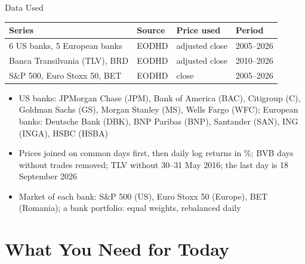 \begin{frame}{Data Used}
\itemsize{\footnotesize}
\begin{center}
\footnotesize
\begin{tabular}{llll}
\toprule
\textbf{Series} & \textbf{Source} & \textbf{Price used} & \textbf{Period} \\
\midrule
6 US banks, 5 European banks & EODHD & adjusted close & 2005--2026 \\
Banca Transilvania (TLV), BRD & EODHD & adjusted close & 2010--2026 \\
S\&P 500, Euro Stoxx 50, BET & EODHD & close & 2005--2026 \\
\bottomrule
\end{tabular}
\end{center}
\begin{itemize}
    \item US banks: JPMorgan Chase (JPM), Bank of America (BAC), Citigroup (C), Goldman Sachs (GS), Morgan Stanley (MS), Wells Fargo (WFC); European banks: Deutsche Bank (DBK), BNP Paribas (BNP), Santander (SAN), ING (INGA), HSBC (HSBA)
    \item Prices joined on common days first, then daily log returns in \%; BVB days without trades removed; TLV without 30--31 May 2016; the last day is 18 September 2026
    \item Market of each bank: S\&P 500 (US), Euro Stoxx 50 (Europe), BET (Romania); a bank portfolio: equal weights, rebalanced daily
\end{itemize}
\end{frame}


\section{What You Need for Today}

